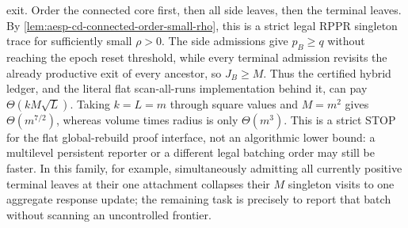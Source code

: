 \begin{corollary}
exit.  Order the connected core first, then all side leaves, then the terminal
leaves.  By \cref{lem:aesp-cd-connected-order-small-rho}, this is a strict legal
RPPR singleton trace for sufficiently small $\rho>0$.  The side admissions
give $p_B\geq q$ without reaching the epoch reset threshold, while every
terminal admission revisits the already productive exit of every ancestor,
so $J_B\geq M$.  Thus the certified hybrid ledger, and the literal flat
scan-all-runs implementation behind it, can pay $\Theta(kM\sqrt L)$.
Taking $k=L=m$ through square values and $M=m^2$ gives
$\Theta(m^{7/2})$, whereas volume times radius is only $\Theta(m^3)$.
This is a strict STOP for the flat global-rebuild proof interface, not an
algorithmic lower bound: a multilevel persistent reporter or a different
legal batching order may still be faster.  In this family, for example,
simultaneously admitting all currently positive terminal leaves at their one
attachment collapses their $M$ singleton visits to one aggregate response
update; the remaining task is precisely to report that batch without scanning
an uncontrolled frontier.
\end{corollary}

